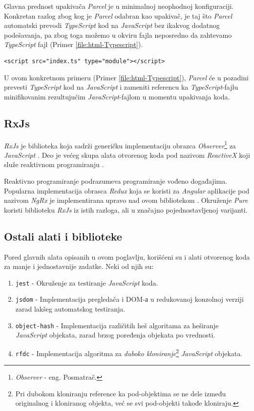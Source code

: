 \documentclass[12pt,oneside]{memoir}
\newcommand{\code}[1]{\allowbreak{\colorbox{codegray}{\texttt{\scalebox{0.9}{#1}}}}}%
\begin{document}
Glavna prednost upakivača \emph{Parcel} je u minimalnoj neophodnoj konfiguraciji.
Konkretan razlog zbog kog je \emph{Parcel} odabran kao upakivač, je taj što \emph{Parcel} automatski
prevodi \emph{TypeScript} kod na \emph{JavaScript} bez ikakvog dodatnog podešavanja, pa zbog toga možemo u okviru
fajla \code{index.html} neposredno da zahtevamo \emph{TypeScript} fajl (Primer \ref{file:html-Typescript}).
\begin{lstlisting}[style=htmlStyle,numberstyle=\tiny, caption={Uključivanje \emph{TypeScript} fajla neposredno u \code{index.html}}, label=file:html-Typescript]
<script src="index.ts" type="module"></script>
\end{lstlisting}
U ovom konkretnom primeru (Primer \ref{file:html-Typescript}), \emph{Parcel} će u pozadini prevesti \emph{TypeScript} kod na \emph{JavaScript}
i zameniti referencu ka \emph{TypeScript}-fajlu minifikovanim rezultujućim \emph{JavaScript}-fajlom u momentu upakivanja koda.
\subsection{RxJs}
\emph{RxJs} je biblioteka koja sadrži generičku implementaciju obrazca \emph{Observer}\footnote{\emph{Observer} - eng. Posmatrač.} za \emph{JavaScript} \cite{GoF} \cite{RxJs}.
Deo je većeg skupa alata otvorenog koda pod nazivom \emph{ReactiveX} koji služe reaktivnom programiranju \cite{ReactiveX}.

Reaktivno programiranje podrazumeva programiranje vođeno događajima. Popularna implementacija obrasca \emph{Redux} koja se koristi za \emph{Angular} aplikacije
pod nazivom \emph{NgRx} je implementirana upravo nad ovom bibliotekom \cite{Redux} \cite{NgRx}. Okruženje \emph{Pure} koristi
biblioteku \emph{RxJs} iz istih razloga, ali u značajno pojednostavljenoj varijanti.
\subsection{Ostali alati i biblioteke}
Pored glavnih alata opisanih u ovom poglavlju, korišćeni su i alati otvorenog koda za manje i jednostavnije zadatke.
Neki od njih su:
\begin{enumerate}
  \item \texttt{jest} - Okruženje za testiranje \emph{JavaScript} koda.
  \item \texttt{jsdom} - Implementacija pregledača i DOM-а u redukovanoj konzolnoj verziji zarad lakšeg automatskog testiranja.
  \item \texttt{object-hash} - Implementacija različitih heš algoritama za heširanje
  \emph{JavaScript} objekata, zarad brzog poređenja objekata po vrednosti.
  \item \texttt{rfdc} - Implementacija algoritma za \emph{duboko kloniranje}\footnote{Pri dubokom kloniranju reference ka pod-objektima se ne dele između originalnog i kloniranog objekta, već se svi pod-objekti takođe kloniraju.} \emph{JavaScript} objekata. 
\end{enumerate}
\end{document}
